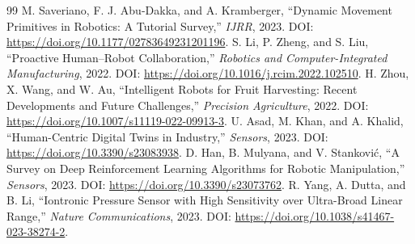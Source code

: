 \documentclass[10pt,a4paper]{article}
\begin{document}
\begin{thebibliography}{99}
 M. Saveriano, F. J. Abu-Dakka, and A. Kramberger, ``Dynamic Movement Primitives in Robotics: A Tutorial Survey,'' \emph{IJRR}, 2023. DOI: \url{https://doi.org/10.1177/02783649231201196}.
 S. Li, P. Zheng, and S. Liu, ``Proactive Human--Robot Collaboration,'' \emph{Robotics and Computer-Integrated Manufacturing}, 2022. DOI: \url{https://doi.org/10.1016/j.rcim.2022.102510}.
 H. Zhou, X. Wang, and W. Au, ``Intelligent Robots for Fruit Harvesting: Recent Developments and Future Challenges,'' \emph{Precision Agriculture}, 2022. DOI: \url{https://doi.org/10.1007/s11119-022-09913-3}.
 U. Asad, M. Khan, and A. Khalid, ``Human-Centric Digital Twins in Industry,'' \emph{Sensors}, 2023. DOI: \url{https://doi.org/10.3390/s23083938}.
 D. Han, B. Mulyana, and V. Stankovi\'c, ``A Survey on Deep Reinforcement Learning Algorithms for Robotic Manipulation,'' \emph{Sensors}, 2023. DOI: \url{https://doi.org/10.3390/s23073762}.
 R. Yang, A. Dutta, and B. Li, ``Iontronic Pressure Sensor with High Sensitivity over Ultra-Broad Linear Range,'' \emph{Nature Communications}, 2023. DOI: \url{https://doi.org/10.1038/s41467-023-38274-2}.
\end{thebibliography}
\end{document}
